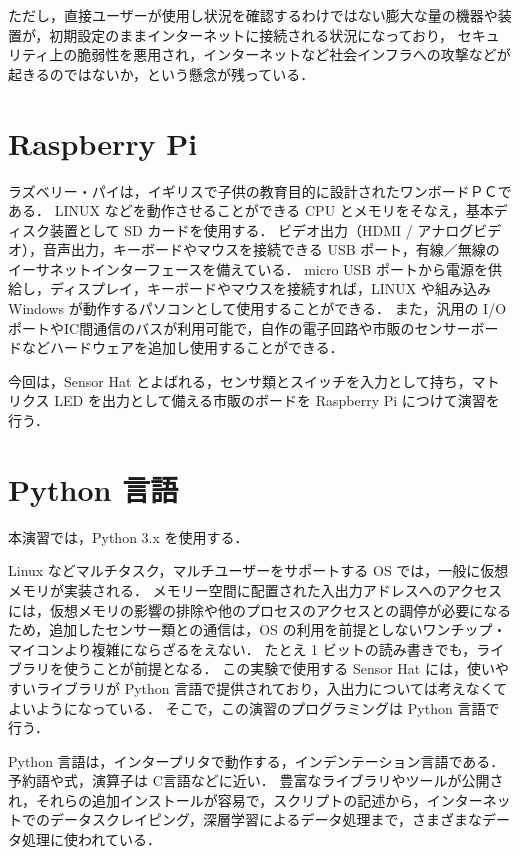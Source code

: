 \documentclass[11pt,a4,epsf]{report}
\begin{document}
ただし，直接ユーザーが使用し状況を確認するわけではない膨大な量の機器や装置が，初期設定のままインターネットに接続される状況になっており，
セキュリティ上の脆弱性を悪用され，インターネットなど社会インフラへの攻撃などが起きるのではないか，という懸念が残っている．

\section{Raspberry Pi}

ラズベリー・パイは，イギリスで子供の教育目的に設計されたワンボードＰＣである．
LINUX などを動作させることができる CPU とメモリをそなえ，基本ディスク装置として SD カードを使用する．
ビデオ出力（HDMI / アナログビデオ），音声出力，キーボードやマウスを接続できる USB ポート，有線／無線のイーサネットインターフェースを備えている．
micro USB ポートから電源を供給し，ディスプレイ，キーボードやマウスを接続すれば，LINUX や組み込み Windows が動作するパソコンとして使用することができる．
また，汎用の I/O ポートやIC間通信のバスが利用可能で，自作の電子回路や市販のセンサーボードなどハードウェアを追加し使用することができる．

今回は，Sensor Hat  とよばれる，センサ類とスイッチを入力として持ち，マトリクス LED を出力として備える市販のボードを Raspberry Pi につけて演習を行う．


\section{Python 言語}

本演習では，Python 3.x を使用する．

Linux などマルチタスク，マルチユーザーをサポートする OS では，一般に仮想メモリが実装される．
メモリー空間に配置された入出力アドレスへのアクセスには，仮想メモリの影響の排除や他のプロセスのアクセスとの調停が必要になるため，追加したセンサー類との通信は，OS の利用を前提としないワンチップ・マイコンより複雑にならざるをえない．
たとえ 1 ビットの読み書きでも，ライブラリを使うことが前提となる．
この実験で使用する Sensor Hat には，使いやすいライブラリが Python 言語で提供されており，入出力については考えなくてよいようになっている．
そこで，この演習のプログラミングは Python 言語で行う．

Python 言語は，インタープリタで動作する，インデンテーション言語である．
予約語や式，演算子は C言語などに近い．
豊富なライブラリやツールが公開され，それらの追加インストールが容易で，スクリプトの記述から，インターネットでのデータスクレイピング，深層学習によるデータ処理まで，さまざまなデータ処理に使われている．
\end{document}
